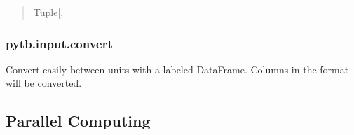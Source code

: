 \documentclass[letterpaper,10pt,english,openany,oneside]{sphinxmanual}
\begin{document}
\begin{fulllineitems}
\begin{quote}
\begin{description}
\begin{description}
\end{description}


\sphinxAtStartPar
Tuple{[},\sphinxhref{https://docs.python.org/3/library/stdtypes.html\#dict}{dict}{]}

\end{description}\end{quote}

\end{fulllineitems}


\sphinxstepscope


\subsubsection{pytb.input.convert}
\label{\detokenize{api/pytb.input.convert:pytb-input-convert}}\label{\detokenize{api/pytb.input.convert::doc}}

\begin{fulllineitems}
\label{\detokenize{api/pytb.input.convert:pytb.input.convert}}
\pysigstartsignatures
{}
\pysigstopsignatures
\sphinxAtStartPar
Convert easily between units with a labeled DataFrame.
Columns in the format  will be converted.

\end{fulllineitems}



\subsection{Parallel Computing}
\label{\detokenize{ref:parallel-computing}}
\end{document}
